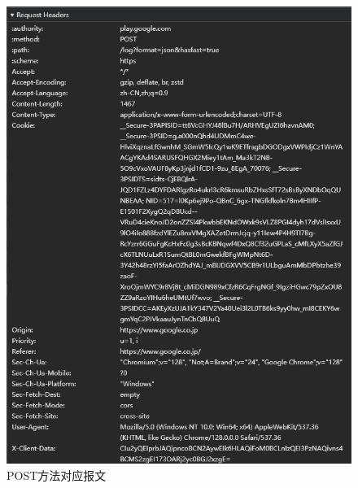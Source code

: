 \begin{figure}[!htbp]
    \centering
    \includegraphics[width=\textwidth]{figures/POST2.png}
    \caption{POST方法对应报文}\label{POST2}
\end{figure}






